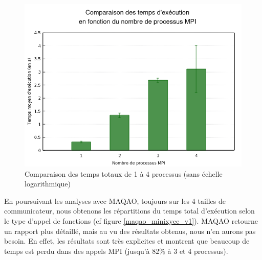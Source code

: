 \documentclass[11pt,a4paper,oneside]{memoir}
\theoremstyle{definition}
\theoremstyle{remark}
\theoremstyle{plain}
\begin{document}
\begin{figure}
\begin{center}
\includegraphics[scale=0.6]{Images-Rapport/Profil_miniXyce_v2/Comparaison_profil_v2.png}
\caption{Comparaison des temps totaux de 1 à 4 processus (sans échelle logarithmique)}
\label{profil_minixyce_v2_comparaison}
\end{center}
\end{figure}


En poursuivant les analyses avec MAQAO, toujours sur les 4 tailles de communicateur, nous obtenons les répartitions du temps total d'exécution selon le type d'appel de fonctions (cf figure \ref{maqao_minixyce_v1}). MAQAO retourne un rapport plus détaillé, mais au vu des résultats obtenus, nous n'en aurons pas besoin. En effet, les résultats sont très explicites et montrent que beaucoup de temps est perdu dans des appels MPI (jusqu'à 82\% à 3 et 4 processus).
\end{document}
